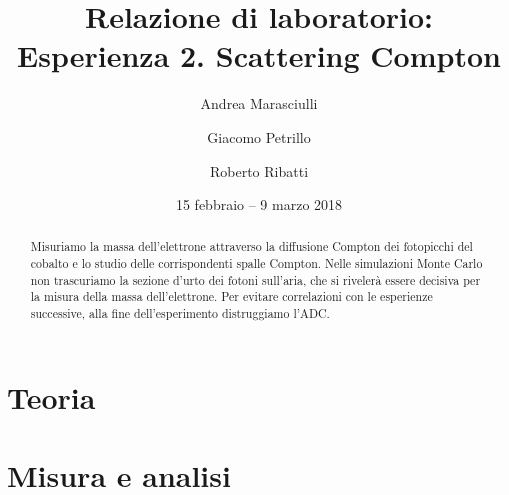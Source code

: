 \documentclass[a4paper]{article}
\title{Relazione di laboratorio:\\
Esperienza 2. Scattering Compton}
\author{Andrea Marasciulli
\and Giacomo Petrillo
\and Roberto Ribatti}
\date{15 febbraio -- 9 marzo 2018}
\begin{document}
\maketitle

\begin{abstract}
	Misuriamo la massa dell'elettrone attraverso la diffusione Compton dei fotopicchi del cobalto e lo studio delle corrispondenti spalle Compton. Nelle simulazioni Monte Carlo non trascuriamo la sezione d'urto dei fotoni sull'aria, che si rivelerà essere decisiva per la misura della massa dell'elettrone.
	Per evitare correlazioni con le esperienze successive, alla fine dell'esperimento distruggiamo l'ADC.
\end{abstract}

{\small \tableofcontents}

\newpage

%

\section{Teoria}





\section{Misura e analisi}





%
\end{document}
